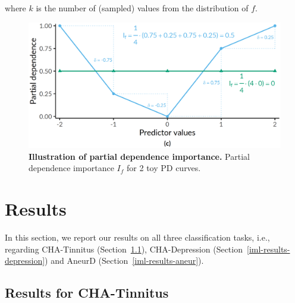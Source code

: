 \documentclass[
  oneside]{book}
\begin{document}
where \(k\) is the number of (sampled) values from the distribution of \(f\).



\begin{figure}

{\centering \includegraphics[width=0.5\linewidth]{figures/09-pd-intro-2} 

}

\caption{\textbf{Illustration of partial dependence importance.} Partial dependence importance \(I_f\) for 2 toy PD curves.}\label{fig:09-pd-intro-2}
\end{figure}

\hypertarget{iml-results}{%
\section{Results}\label{iml-results}}

In this section, we report our results on all three classification tasks, i.e., regarding CHA-Tinnitus (Section~\ref{iml-results-tinnitus}),
CHA-Depression (Section~\ref{iml-results-depression}) and
AneurD (Section~\ref{iml-results-aneur}).

\hypertarget{iml-results-tinnitus}{%
\subsection{Results for CHA-Tinnitus}\label{iml-results-tinnitus}}
\end{document}

